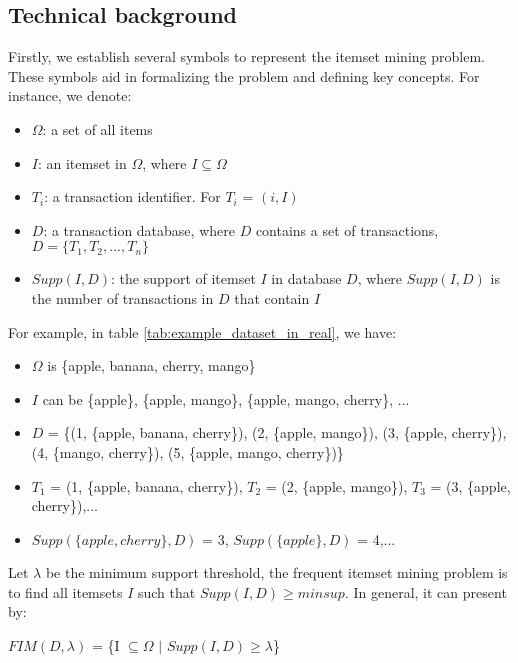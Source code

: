 \subsection{Technical background}
Firstly, we establish several symbols to represent the itemset mining problem.
These symbols aid in formalizing the problem and defining key concepts.
For instance, we denote:
\begin{itemize}
    \item \textbf{$\Omega$}: a set of all items
    \item \textbf{$I$}: an itemset in $\Omega$, where $I \subseteq \Omega$
    \item \textbf{$T_i$}: a transaction identifier. For $T_i$ = $(i,I)$
    \item \textbf{$D$}: a transaction database, where $D$ contains a set of transactions, $D = \{T_1, T_2, ..., T_n\}$
    \item \textbf{$Supp(I, D)$}: the support of itemset $I$ in database $D$, where $Supp(I, D)$ is the number of transactions in $D$ that contain $I$
\end{itemize}
For example, in table \ref{tab:example_dataset_in_real}, we have:
\begin{itemize}
    \item $\Omega$ is \{apple, banana, cherry, mango\}
    \item $I$ can be \{apple\}, \{apple, mango\}, \{apple, mango, cherry\}, ...
    \item $D$ = \{(1, \{apple, banana, cherry\}), (2, \{apple, mango\}), (3, \{apple, cherry\}), (4, \{mango, cherry\}), (5, \{apple, mango, cherry\})\}
    \item $T_1$ = (1, \{apple, banana, cherry\}), $T_2$ = (2, \{apple, mango\}), $T_3$ = (3, \{apple, cherry\}),...
    \item $Supp(\{apple, cherry\}, D)$ = 3, $Supp(\{apple\}, D)$ = 4,...
\end{itemize}
Let $\lambda$ be the minimum support threshold,
the frequent itemset mining problem is to find all itemsets $I$ such that $Supp(I, D) \geq minsup$. In general, it can present by:

\begin{center}
    $FIM(D,\lambda)$ = \{I $\subseteq \Omega$ $|$ $Supp(I, D) \geq \lambda$\}
\end{center}
